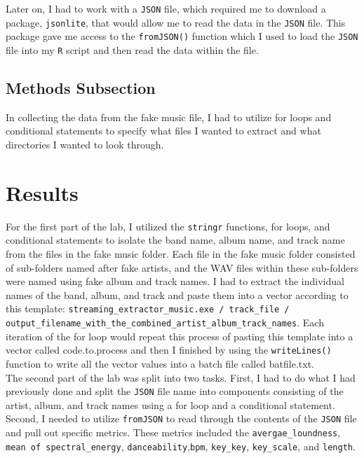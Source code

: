 \documentclass{article}\usepackage[]{graphicx}\usepackage[]{xcolor}
\begin{document}
\begin{multicols}{2}
\noindent Later on, I had to  work with a \texttt{JSON} file, which required me to download a package, \texttt{jsonlite}, that would allow me to read the data in the \texttt{JSON} file. This package gave me access to the \texttt{fromJSON()} function which I used to load the \texttt{JSON} file into my \texttt{R} script and then read the data within the file. 


\subsection{Methods Subsection}
In collecting the data from the fake music file, I had to utilize for loops and conditional statements to specify what files I wanted to extract and what directories I wanted to look through. 

\section{Results}

For the first part of the lab, I utilized the \texttt{stringr} functions, for loops, and conditional statements to isolate the band name, album name, and track name from the files in the fake music folder. Each file in the fake music folder consisted of sub-folders named after fake artists, and the WAV files within these sub-folders were named using fake album and track names. I had to extract the individual names of the band, album, and track and paste them into a vector according to this template: \texttt{streaming\_extractor\_music.exe / track\_file / output\_filename\_with\_the\_combined\_artist\_album\_track\_names}. Each iteration of the for loop would repeat this process of pasting this template into a vector called code.to.process and then I finished by using the \texttt{writeLines()} function to write all the vector values into a batch file called batfile.txt.\\

\noindent The second part of the lab was split into two tasks. First, I had to do what I had previously done and split the \texttt{JSON} file name into components consisting of the artist, album, and track names using a for loop and a conditional statement. Second, I needed to utilize \texttt{fromJSON} to read through the contents of the \texttt{JSON} file and pull out specific metrics. These metrics included the \texttt{avergae\_loundness}, \texttt{mean of spectral\_energy}, \texttt{danceability},\texttt{bpm}, \texttt{key\_key}, \texttt{key\_scale}, and \texttt{length}.



\end{multicols}
\end{document}
